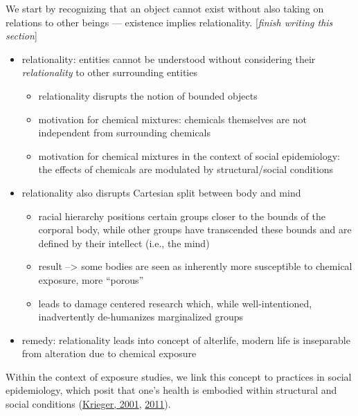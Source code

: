 \documentclass[12pt, twoside]{amherstthesis}
\providecommand{\tightlist}{%
  \setlength{\itemsep}{0pt}\setlength{\parskip}{0pt}}
\begin{document}
We start by recognizing that an object cannot exist without also taking on relations to other beings --- existence implies relationality. {[}\emph{finish writing this section}{]}
\begin{itemize}
\tightlist
\item
  relationality: entities cannot be understood without considering their \emph{relationality} to other surrounding entities
  \begin{itemize}
  \tightlist
  \item
    relationality disrupts the notion of bounded objects
  \item
    motivation for chemical mixtures: chemicals themselves are not independent from surrounding chemicals
  \item
    motivation for chemical mixtures in the context of social epidemiology: the effects of chemicals are modulated by structural/social conditions
  \end{itemize}
\item
  relationality also disrupts Cartesian split between body and mind
  \begin{itemize}
  \tightlist
  \item
    racial hierarchy positions certain groups closer to the bounds of the corporal body, while other groups have transcended these bounds and are defined by their intellect (i.e., the mind)
  \item
    result --\textgreater{} some bodies are seen as inherently more susceptible to chemical exposure, more ``porous''
  \item
    leads to damage centered research which, while well-intentioned, inadvertently de-humanizes marginalized groups
  \end{itemize}
\item
  remedy: relationality leads into concept of alterlife, modern life is inseparable from alteration due to chemical exposure
\end{itemize}
Within the context of exposure studies, we link this concept to practices in social epidemiology, which posit that one's health is embodied within structural and social conditions (\protect\hyperlink{ref-krieger_theories_2001}{Krieger, 2001}, \protect\hyperlink{ref-krieger_epidemiology_2011}{2011}).
\end{document}
